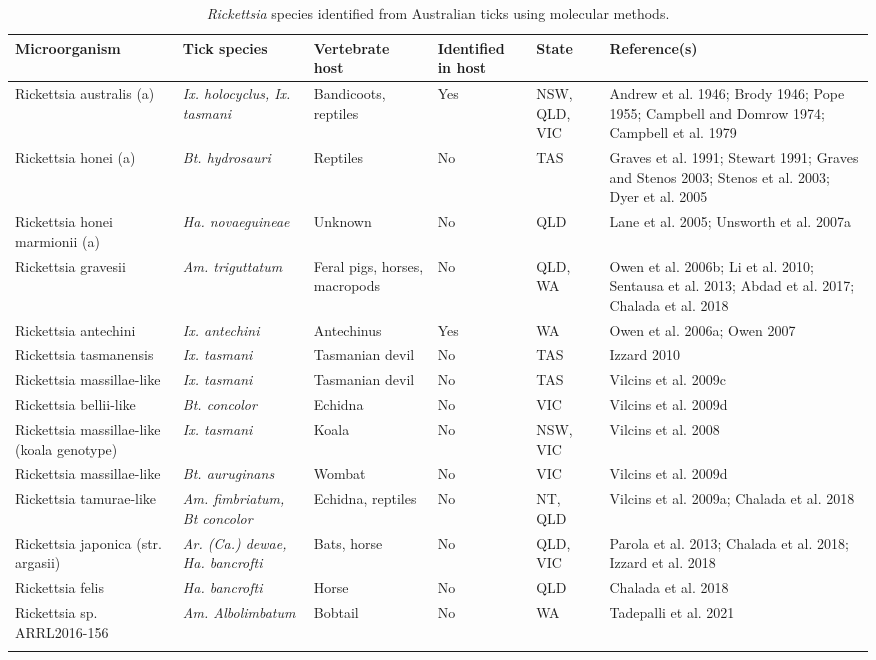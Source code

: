 \documentclass[a4paper, nobind]{templates/ociamthesis}
\begin{document}
\begin{table}

\caption[\textit{Rickettsia} species identified from Australian ticks.]{\label{tab:T1rickettsia}\textit{Rickettsia} species identified from Australian ticks using molecular methods.}
\centering
\fontsize{8}{10}\selectfont
\begin{tabular}[t]{>{\raggedright\arraybackslash}p{10em}>{\raggedright\arraybackslash}p{10em}>{\raggedright\arraybackslash}p{8em}>{\raggedright\arraybackslash}p{6em}>{\raggedright\arraybackslash}p{6em}>{\raggedright\arraybackslash}p{6em}}
\toprule
Microorganism & Tick species & Vertebrate host & Identified in host & State & Reference(s)\\
\midrule
Rickettsia australis (a) & \em{Ix. holocyclus, Ix. tasmani} & Bandicoots, reptiles & Yes & NSW, QLD, VIC & Andrew et al. 1946; Brody 1946; Pope 1955; Campbell and Domrow 1974; Campbell et al. 1979\\
Rickettsia honei (a) & \em{Bt. hydrosauri} & Reptiles & No & TAS & Graves et al. 1991; Stewart 1991; Graves and Stenos 2003;  Stenos et al. 2003; Dyer et al. 2005\\
Rickettsia honei marmionii (a) & \em{Ha. novaeguineae} & Unknown & No & QLD & Lane et al. 2005; Unsworth et al. 2007a\\
Rickettsia gravesii & \em{Am. triguttatum} & Feral pigs, horses, macropods & No & QLD, WA & Owen et al. 2006b; Li et al. 2010; Sentausa et al. 2013; Abdad et al. 2017; Chalada et al. 2018\\
Rickettsia antechini & \em{Ix. antechini} & Antechinus & Yes & WA & Owen et al. 2006a; Owen 2007\\
Rickettsia tasmanensis & \em{Ix. tasmani} & Tasmanian devil & No & TAS & Izzard 2010\\
Rickettsia massillae-like & \em{Ix. tasmani} & Tasmanian devil & No & TAS & Vilcins et al. 2009c\\
Rickettsia bellii-like & \em{Bt. concolor} & Echidna & No & VIC & Vilcins et al. 2009d\\
Rickettsia massillae-like (koala genotype) & \em{Ix. tasmani} & Koala & No & NSW, VIC & Vilcins et al. 2008\\
Rickettsia massillae-like & \em{Bt. auruginans} & Wombat & No & VIC & Vilcins et al. 2009d\\
Rickettsia tamurae-like & \em{Am. fimbriatum, Bt concolor} & Echidna, reptiles & No & NT, QLD & Vilcins et al. 2009a; Chalada et al. 2018\\
Rickettsia japonica (str. argasii) & \em{Ar. (Ca.) dewae, Ha. bancrofti} & Bats, horse & No & QLD, VIC & Parola et al. 2013; Chalada et al. 2018; Izzard et al. 2018\\
Rickettsia felis & \em{Ha. bancrofti} & Horse & No & QLD & Chalada et al. 2018\\
Rickettsia sp. ARRL2016-156 & \em{Am. Albolimbatum} & Bobtail & No & WA & Tadepalli et al. 2021\\
\bottomrule
\multicolumn{6}{l}{\rule{0pt}{1em}\textsuperscript{a} Recognised human tick-borne pathogen.}\\
\end{tabular}
\end{table}
\end{document}
